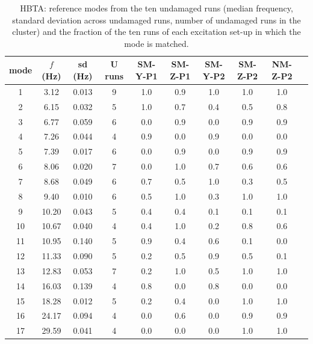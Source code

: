 \begin{table}[h]\centering\footnotesize
\caption{HBTA: reference modes from the ten undamaged runs (median frequency, standard deviation across undamaged runs, number of undamaged runs in the cluster) and the fraction of the ten runs of each excitation set-up in which the mode is matched.}\label{tab:s10}
\begin{tabular}{cccccccccc}\toprule
mode & $f$ (Hz) & sd (Hz) & U runs & SM-Y-P1 & SM-Z-P1 & SM-Y-P2 & SM-Z-P2 & NM-Z-P2\\ \midrule
1 & 3.12 & 0.013 & 9 & 1.0 & 0.9 & 1.0 & 1.0 & 1.0 \\
2 & 6.15 & 0.032 & 5 & 1.0 & 0.7 & 0.4 & 0.5 & 0.8 \\
3 & 6.77 & 0.059 & 6 & 0.0 & 0.9 & 0.0 & 0.9 & 0.9 \\
4 & 7.26 & 0.044 & 4 & 0.9 & 0.0 & 0.9 & 0.0 & 0.0 \\
5 & 7.39 & 0.017 & 6 & 0.0 & 0.9 & 0.0 & 0.9 & 0.9 \\
6 & 8.06 & 0.020 & 7 & 0.0 & 1.0 & 0.7 & 0.6 & 0.6 \\
7 & 8.68 & 0.049 & 6 & 0.7 & 0.5 & 1.0 & 0.3 & 0.5 \\
8 & 9.40 & 0.010 & 6 & 0.5 & 1.0 & 0.3 & 1.0 & 1.0 \\
9 & 10.20 & 0.043 & 5 & 0.4 & 0.4 & 0.1 & 0.1 & 0.1 \\
10 & 10.67 & 0.040 & 4 & 0.4 & 1.0 & 0.2 & 0.8 & 0.6 \\
11 & 10.95 & 0.140 & 5 & 0.9 & 0.4 & 0.6 & 0.1 & 0.0 \\
12 & 11.33 & 0.090 & 5 & 0.2 & 0.5 & 0.9 & 0.5 & 0.1 \\
13 & 12.83 & 0.053 & 7 & 0.2 & 1.0 & 0.5 & 1.0 & 1.0 \\
14 & 16.03 & 0.139 & 4 & 0.8 & 0.0 & 0.8 & 0.0 & 0.0 \\
15 & 18.28 & 0.012 & 5 & 0.2 & 0.4 & 0.0 & 1.0 & 1.0 \\
16 & 24.17 & 0.094 & 4 & 0.0 & 0.6 & 0.0 & 0.9 & 0.9 \\
17 & 29.59 & 0.041 & 4 & 0.0 & 0.0 & 0.0 & 1.0 & 1.0 \\
\bottomrule\end{tabular}\end{table}